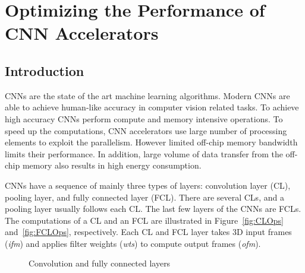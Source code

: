 \documentclass[a4paper,10pt]{article}
\begin{document}

\section{Optimizing the Performance of CNN Accelerators}
\subsection{Introduction}
CNNs are the state of the art machine learning algorithms. Modern CNNs are able to achieve human-like accuracy in computer vision related tasks. To achieve high accuracy CNNs perform compute and memory intensive operations. To speed up the computations, CNN accelerators use large number of processing elements to exploit the parallelism. However limited off-chip memory bandwidth limits their performance. In addition, large volume of data transfer from the off-chip memory also results in high energy consumption. 

CNNs have a sequence of mainly three types of layers: convolution layer (CL), pooling layer, and fully connected layer (FCL). There are several CLs, and a pooling layer usually follows each CL. The last few layers of the CNNs are FCLs. The computations of a CL and an FCL are illustrated in Figure~\ref{fig:CLOps} and~\ref{fig:FCLOps}, respectively. Each CL and FCL layer takes 3D input frames (\textit{ifm}) and applies filter weights (\textit{wts}) to compute output frames (\textit{ofm}).
\begin{figure}[!htb]
	\centering
    \captionsetup{font=sf}	
	\hfil	
	\hfil	
	\caption{Convolution and fully connected layers}
	\label{fig:CNNAcceleratorAndCLOps}
\end{figure}
\end{document}
